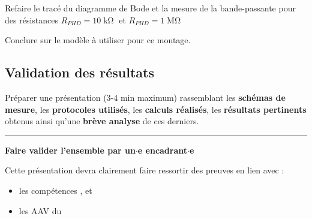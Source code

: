 \medskip

\Manip Refaire le tracé du diagramme de Bode et la mesure de la bande-passante pour des résistances $R_{PHD} = 10\operatorname{k\Omega}$ et $R_{PHD} = 1\operatorname{M\Omega}$

\Quest Conclure sur le modèle à utiliser pour ce montage. 



\subsection{Validation des résultats}

\Real Préparer une présentation (3-4 min maximum) rassemblant les \textbf{schémas de mesure}, les \textbf{protocoles utilisés}, les \textbf{calculs réalisés}, les \textbf{résultats pertinents} obtenus ainsi qu'une \textbf{brève analyse} de ces derniers.

\medskip

\noindent \rule{\linewidth}{1pt}

\textbf{\Large Faire valider l'ensemble par un$\cdot$e encadrant$\cdot$e}

\medskip

Cette présentation devra clairement faire ressortir des preuves en lien avec :

\begin{itemize}
	\item les compétences ,  et 
	\item les AAV du 
\end{itemize}



